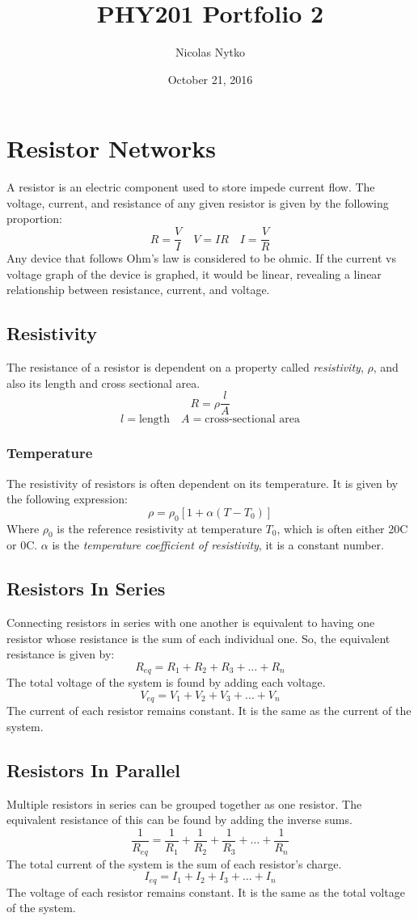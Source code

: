 \documentclass{article}
\title{PHY201 Portfolio 2}
\author{Nicolas Nytko}
\date{October 21, 2016}
\begin{document}
\maketitle
\newpage
\section{Resistor Networks}
A resistor is an electric component used to store impede current flow.  The voltage, current, and resistance of any given resistor is given by the following proportion:
\[R=\frac{V}{I} \quad V=IR \quad I=\frac{V}{R} \]
Any device that follows Ohm's law is considered to be ohmic.  If the current vs voltage graph of the device is graphed, it would be linear, revealing a linear relationship between resistance, current, and voltage.
\subsection{Resistivity}
The resistance of a resistor is dependent on a property called \textit{resistivity}, $\rho$, and also its length and cross sectional area.
\[ R = \rho \frac{l}{A} \]
\[ l = \text{length} \quad A = \text{cross-sectional area} \]
\subsubsection{Temperature}
The resistivity of resistors is often dependent on its temperature.  It is given by the following expression:
\[ \rho = \rho_0 \left[ 1 + \alpha (T - T_0) \right] \]
Where $\rho_0$ is the reference resistivity at temperature $T_0$, which is often either 20{\textdegree}C or 0{\textdegree}C.  $\alpha$ is the \textit{temperature coefficient of resistivity}, it is a constant number.
\subsection{Resistors In Series}
Connecting resistors in series with one another is equivalent to having one resistor whose resistance is the sum of each individual one.  So, the equivalent resistance is given by:
\[R_{eq} = R_1 + R_2 + R_3 + \ldots + R_n\]
The total voltage of the system is found by adding each voltage.
\[V_{eq} = V_1 + V_2 + V_3 + \ldots + V_n\]
The current of each resistor remains constant.  It is the same as the current of the system.
\subsection{Resistors In Parallel}
Multiple resistors in series can be grouped together as one resistor.  The equivalent resistance of this can be found by adding the inverse sums.
\[\frac{1}{R_{eq}} = \frac{1}{R_1} + \frac{1}{R_2} + \frac{1}{R_3} + \ldots + \frac{1}{R_n}\]
The total current of the system is the sum of each resistor's charge.
\[I_{eq} = I_1 + I_2 + I_3 + \ldots + I_n\]
The voltage of each resistor remains constant.  It is the same as the total voltage of the system.
\end{document}
